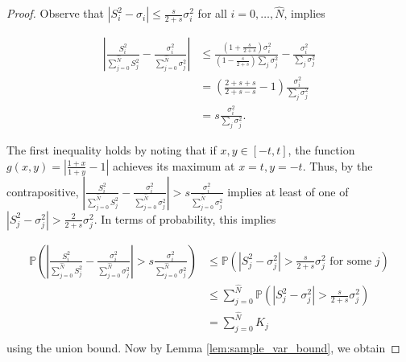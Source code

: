 \documentclass[10pt,a4paper]{amsart}
\begin{document}
\begin{proof}
	Observe that $|S^2_i - \sigma_i|\leq \frac{s}{2+s}\sigma^2_i$ for all $i = 0,\dots, \hat{N}$, implies
	
	\begin{align*}
		\left|\frac{S_i^2}{\sum_{j=0}^{\hat{N}}S_j^2} - \frac{\sigma_i^2}{\sum_{j=0}^{\hat{N}}\sigma_j^2}\right| &\leq \frac{(1+\frac{s}{2+s})\sigma_i^2}{(1-\frac{s}{2+s})\sum_j \sigma^2_j} - \frac{\sigma^2_i}{\sum_j \sigma^2_j}\\
		&= (\frac{2+s+s}{2+s-s}-1) \frac{\sigma^2_i}{\sum_j\sigma^2_j}\\
		&= s\frac{\sigma^2_i}{\sum_j\sigma^2_j}.
	\end{align*}
	
	The first inequality holds by noting that if $x,y \in [-t,t]$, the function $g(x,y) = \left|\frac{1+x}{1+y} - 1\right|$  achieves its maximum at $x = t, y = -t$. Thus, by the contrapositive,  $\left|\frac{S_i^2}{\sum_{j=0}^{\hat{N}}S_j^2} - \frac{\sigma_i^2}{\sum_{j=0}^{\hat{N}}\sigma_j^2}\right| > s\frac{\sigma_i^2}{\sum_{j=0}^{\hat{N}}\sigma_j^2}$ implies at least of one of $|S^2_j - \sigma_j^2| > \frac{2}{2+s}\sigma_j^2$. In terms of probability, this implies
	
	\begin{align*}
		\mathbb{P}\left(\left|\frac{S_i^2}{\sum_{j=0}^{\hat{N}}S_j^2} - \frac{\sigma_i^2}{\sum_{j=0}^{\hat{N}}\sigma_j^2}\right|>s\frac{\sigma_i^2}{\sum_{j=0}^{\hat{N}}\sigma_j^2}\right)&\leq \mathbb{P}\left(|S^2_j - \sigma^2_j|> \frac{s}{2+s}\sigma^2_j\text{ for some } j\right) \\
		&\leq \sum_{j=0}^{\hat{N}} \mathbb{P}\left(|S^2_j - \sigma^2_j|> \frac{s}{2+s}\sigma^2_j\right)\\
		& = \sum_{j=0}^{\hat{N}} K_j\\
	\end{align*}
	using the union bound. Now by Lemma \ref{lem:sample_var_bound}, we obtain
	

\end{proof}
\end{document}
